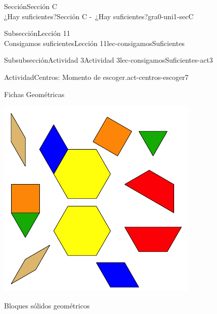 \begin{sectionptx}{Sección}{{\Large Sección C\\}¿Hay suficientes?}{}{Sección C -~¿Hay suficientes?}{}{}{gra0-uni1-secC}
\begin{subsectionptx}{Subsección}{{\normalsize Lección 11\\[-0.05cm]}Consigamos suficientes}{}{Lección 11}{}{}{lec-consigamosSuficientes}
\begin{subsubsectionptx}{Subsubsección}{Actividad 3}{}{Actividad 3}{}{}{lec-consigamosSuficientes-act3}
\begin{activity}{Actividad}{Centros: Momento de escoger.}{act-centros-escoger7}
\begin{sidebyside}{2}{0.025}{0.025}{0.05}
\begin{sbspanel}{0.45}
\end{sbspanel}%
\begin{sbspanel}{0.45}%
Fichas Geométricas%
\par
\includegraphics[max width=\linewidth, center]{external/svg-source/tikz-file-147344.pdf}
\end{sbspanel}%
\end{sidebyside}%
\vspace*{1ex minus 0.8ex}
\begin{sidebyside}{2}{0.025}{0.025}{0.05}%
\begin{sbspanel}{0.45}%
Bloques sólidos geométricos%
\par

\end{sbspanel}
\end{sidebyside}
\end{activity}
\end{subsubsectionptx}
\end{subsectionptx}
\end{sectionptx}

